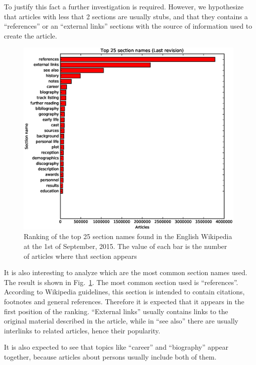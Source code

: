 To justify this fact a further investigation is required.
However, we hypothesize that articles with less that 2 sections are usually stubs, and that they contains a ``references'' or an ``external links'' sections with the source of information used to create the article.

\begin{figure}[h]
\centering
\includegraphics[keepaspectratio=true, width=\textwidth]{assets/section_names_last_top_25}
\caption{Ranking of the top 25 section names found in the English Wikipedia at the 1st of September, 2015.
The value of each bar is the number of articles where that section appears}
\label{fig:section_names_last_top_25}
\end{figure}

It is also interesting to analyze which are the most common section names used.
The result is shown in Fig.~\ref{fig:section_names_last_top_25}.
The most common section used is ``references''.
According to Wikipedia guidelines, this section is intended to contain citations, footnotes and general references.
Therefore it is expected that it appears in the first position of the ranking.
``External links'' usually contains links to the original material described in the article, while in ``see also'' there are usually interlinks to related articles, hence their popularity.

It is also expected to see that topics like ``career'' and ``biography'' appear together, because articles about persons usually include both of them.


